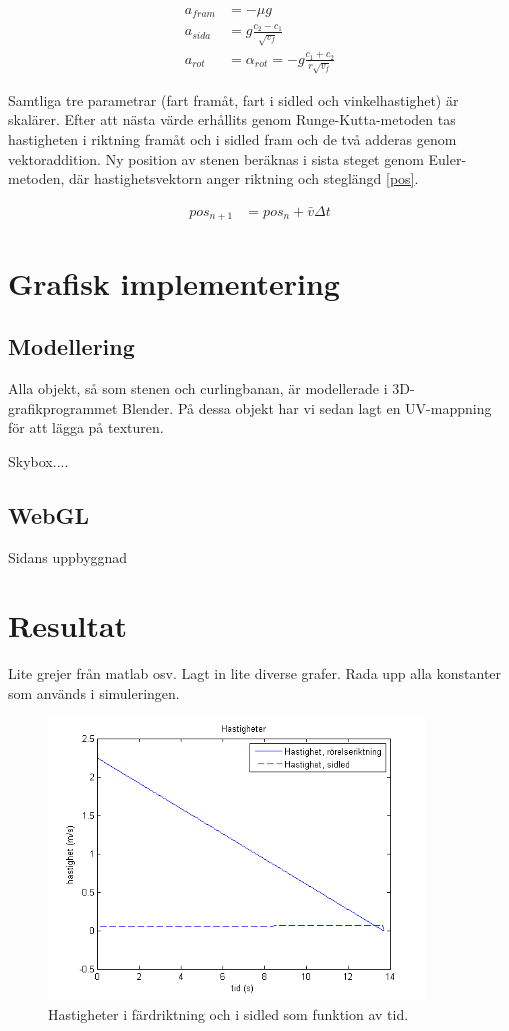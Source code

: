 \documentclass[11pt]{article} %
\begin{document}
 \begin{align}\label{a_front}
 a_{fram}& = - \mu g\\\label{a_side}
 a_{sida}& = g \frac{c_2-c_1}{\sqrt{v_f}}\\\label{a_rotation}
 a_{rot}& = \alpha_{rot} = - g\frac{c_1+c_2}{r \sqrt{v_f}}
 \end{align}

Samtliga tre parametrar (fart framåt, fart i sidled och vinkelhastighet) är skalärer. Efter att nästa värde erhållits genom Runge-Kutta-metoden tas hastigheten i riktning framåt och i sidled fram och de två adderas genom vektoraddition. Ny position av stenen beräknas i sista steget genom Euler-metoden, där hastighetsvektorn anger riktning och steglängd \eqref{pos}. 

 \begin{align}\label{pos}
 pos_{n+1}& = pos_{n} + \bar{v} \Delta t
 \end{align}


\section{Grafisk implementering}

\subsection{Modellering}
Alla objekt, så som stenen och curlingbanan, är modellerade i 3D-grafikprogrammet Blender. På dessa objekt har vi sedan lagt en UV-mappning för att lägga på texturen. 

Skybox....

\subsection{WebGL}
Sidans uppbyggnad

\pagebreak
\section{Resultat}

Lite grejer från matlab osv. 
Lagt in lite diverse grafer.
Rada upp alla konstanter som används i simuleringen. 

\begin{figure}[ht!]
\centering
\includegraphics[width=100mm]{hastigheter_tid_graf.png}
\caption{Hastigheter i färdriktning och i sidled som funktion av tid.}
\label{fig:hast_graf}
\label{overflow}
\end{figure}
\end{document}
